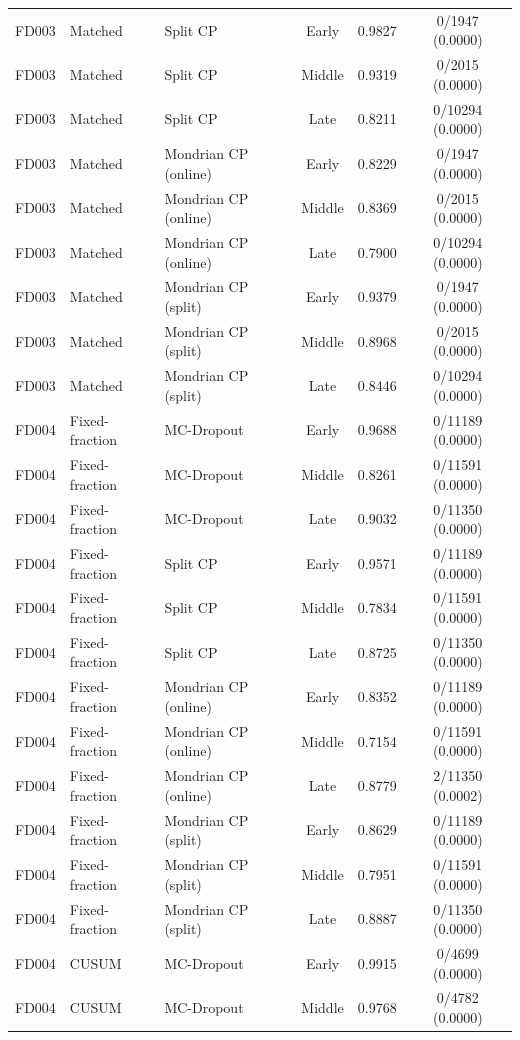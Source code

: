 \begin{table}[t]
\begin{tabular}{lllccc}
FD003 & Matched & Split CP & Early & 0.9827 & 0/1947 (0.0000) \\
FD003 & Matched & Split CP & Middle & 0.9319 & 0/2015 (0.0000) \\
FD003 & Matched & Split CP & Late & 0.8211 & 0/10294 (0.0000) \\
FD003 & Matched & Mondrian CP (online) & Early & 0.8229 & 0/1947 (0.0000) \\
FD003 & Matched & Mondrian CP (online) & Middle & 0.8369 & 0/2015 (0.0000) \\
FD003 & Matched & Mondrian CP (online) & Late & 0.7900 & 0/10294 (0.0000) \\
FD003 & Matched & Mondrian CP (split) & Early & 0.9379 & 0/1947 (0.0000) \\
FD003 & Matched & Mondrian CP (split) & Middle & 0.8968 & 0/2015 (0.0000) \\
FD003 & Matched & Mondrian CP (split) & Late & 0.8446 & 0/10294 (0.0000) \\
FD004 & Fixed-fraction & MC-Dropout & Early & 0.9688 & 0/11189 (0.0000) \\
FD004 & Fixed-fraction & MC-Dropout & Middle & 0.8261 & 0/11591 (0.0000) \\
FD004 & Fixed-fraction & MC-Dropout & Late & 0.9032 & 0/11350 (0.0000) \\
FD004 & Fixed-fraction & Split CP & Early & 0.9571 & 0/11189 (0.0000) \\
FD004 & Fixed-fraction & Split CP & Middle & 0.7834 & 0/11591 (0.0000) \\
FD004 & Fixed-fraction & Split CP & Late & 0.8725 & 0/11350 (0.0000) \\
FD004 & Fixed-fraction & Mondrian CP (online) & Early & 0.8352 & 0/11189 (0.0000) \\
FD004 & Fixed-fraction & Mondrian CP (online) & Middle & 0.7154 & 0/11591 (0.0000) \\
FD004 & Fixed-fraction & Mondrian CP (online) & Late & 0.8779 & 2/11350 (0.0002) \\
FD004 & Fixed-fraction & Mondrian CP (split) & Early & 0.8629 & 0/11189 (0.0000) \\
FD004 & Fixed-fraction & Mondrian CP (split) & Middle & 0.7951 & 0/11591 (0.0000) \\
FD004 & Fixed-fraction & Mondrian CP (split) & Late & 0.8887 & 0/11350 (0.0000) \\
FD004 & CUSUM & MC-Dropout & Early & 0.9915 & 0/4699 (0.0000) \\
FD004 & CUSUM & MC-Dropout & Middle & 0.9768 & 0/4782 (0.0000) \\

\end{tabular}
\end{table}
